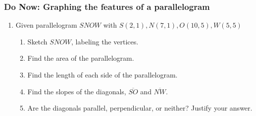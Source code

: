 \documentclass[12pt, oneside]{article}
\begin{document}
\subsubsection*{Do Now: Graphing the features of a parallelogram}
  \begin{enumerate}

\item Given parallelogram $SNOW$ with $S(2,1),N(7,1),O(10,5),W(5,5)$
    \begin{enumerate}
      \item Sketch $SNOW$, labeling the vertices.\\
      \item Find the area of the parallelogram.\vspace{3cm}
      \item Find the length of each side of the parallelogram.\vspace{5cm}
      \item Find the slopes of the diagonals, $\overline{SO}$ and $\overline{NW}$.\vspace{3.5cm}
      \item Are the diagonals parallel, perpendicular, or neither? Justify your answer.
  \end{enumerate}

\end{enumerate}
\end{document}
